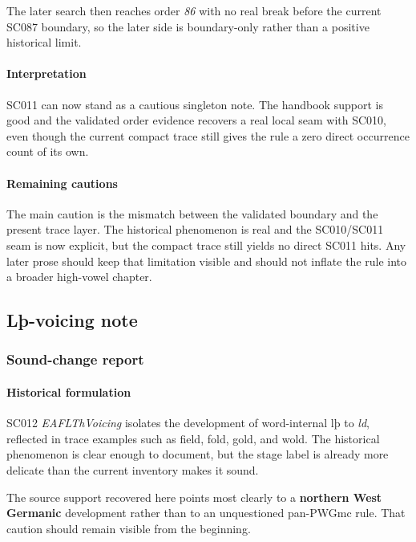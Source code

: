 \documentclass[
  british,
  a4paper,
]{article}
\begin{document}
The later search then reaches order \emph{86} with no real break before
the current SC087 boundary, so the later side is boundary-only rather
than a positive historical limit.

\paragraph{Interpretation}\label{interpretation-8}

SC011 can now stand as a cautious singleton note. The handbook support
is good and the validated order evidence recovers a real local seam with
SC010, even though the current compact trace still gives the rule a zero
direct occurrence count of its own.

\paragraph{Remaining cautions}\label{remaining-cautions-8}

The main caution is the mismatch between the validated boundary and the
present trace layer. The historical phenomenon is real and the
SC010/SC011 seam is now explicit, but the compact trace still yields no
direct SC011 hits. Any later prose should keep that limitation visible
and should not inflate the rule into a broader high-vowel chapter.

\subsection{Lþ-voicing note}\label{luxfe-voicing-note}

\subsubsection{Sound-change report}\label{sound-change-report-9}

\paragraph{Historical formulation}\label{historical-formulation-9}

SC012 \emph{EAFLThVoicing} isolates the development of word-internal lþ
to \emph{ld}, reflected in trace examples such as field, fold, gold, and
wold. The historical phenomenon is clear enough to document, but the
stage label is already more delicate than the current inventory makes it
sound.

The source support recovered here points most clearly to a
\textbf{northern West Germanic} development rather than to an
unquestioned pan-PWGmc rule. That caution should remain visible from the
beginning.
\end{document}

